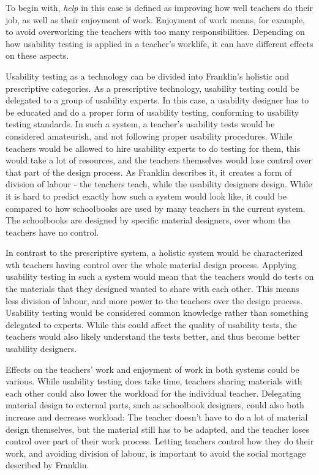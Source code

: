 To begin with, \textit{help} in this case is defined as improving how well teachers do their job, as well as their enjoyment of work. Enjoyment of work means, for example, to avoid overworking the teachers with too many responsibilities. Depending on how usability testing is applied in a teacher's worklife, it can have different effects on these aspects.

Usability testing as a technology can be divided into Franklin's holistic and prescriptive categories. As a prescriptive technology, usability testing could be delegated to a group of usability experts. In this case, a usability designer has to be educated and do a proper form of usability testing, conforming to usability testing standards. In such a system, a teacher's usability tests would be considered amateurish, and not following proper usability procedures. While teachers would be allowed to hire usability experts to do testing for them, this would take a lot of resources, and the teachers themselves would lose control over that part of the design process. As Franklin describes it, it creates a form of division of labour - the teachers teach, while the usability designers design. While it is hard to predict exactly how such a system would look like, it could be compared to how schoolbooks are used by many teachers in the current system. The schoolbooks are designed by specific material designers, over whom the teachers have no control.

In contrast to the prescriptive system, a holistic system would be characterized wth teachers having control over the whole material design process. Applying usability testing in such a system would mean that the teachers would do tests on the materials that they designed wanted to share with each other. This means less division of labour, and more power to the teachers over the design process. Usability testing would be considered common knowledge rather than something delegated to experts. While this could affect the quality of usability tests, the teachers would also likely understand the tests better, and thus become better usability designers.

Effects on the teachers' work and enjoyment of work in both systems could be various. While usability testing does take time, teachers sharing materials with each other could also lower the workload for the individual teacher. Delegating material design to external parts, such as schoolbook designers, could also both increase and decrease workload: The teacher doesn't have to do a lot of material design themselves, but the material still has to be adapted, and the teacher loses control over part of their work process. Letting teachers control how they do their work, and avoiding division of labour, is important to avoid the social mortgage described by Franklin.

